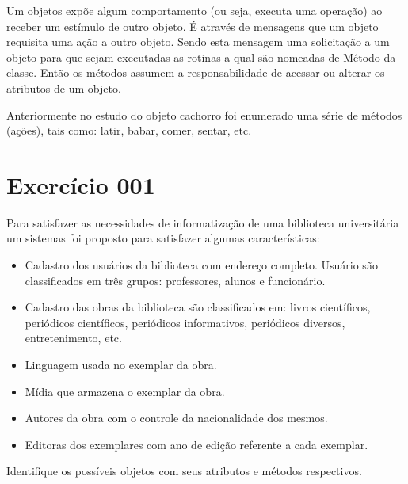 Um objetos expõe algum comportamento (ou seja, executa uma operação) ao 
receber um estímulo de outro objeto. É através de mensagens que um objeto 
requisita uma ação a outro objeto. Sendo esta mensagem uma solicitação a um 
objeto para que sejam executadas as rotinas a qual são nomeadas de Método da 
classe. Então os métodos assumem a responsabilidade de acessar ou alterar os 
atributos de um objeto.

Anteriormente no estudo do objeto cachorro foi enumerado uma série de métodos 
(ações), tais como: latir, babar, comer, sentar, etc.

\section{Exercício 001}

Para satisfazer as necessidades de informatização de uma biblioteca 
universitária um sistemas foi proposto para satisfazer algumas características:

\begin{itemize}
  \item Cadastro dos usuários da biblioteca com endereço completo. 
  Usuário são classificados em três grupos: professores, alunos e funcionário.  
  \item Cadastro das obras da biblioteca são classificados em: livros científicos, periódicos científicos, periódicos informativos, periódicos diversos, entretenimento, etc.
  \item Linguagem usada no exemplar da obra.
  \item Mídia que armazena o exemplar da obra.
  \item Autores da obra com o controle da nacionalidade dos mesmos.
  \item Editoras dos exemplares com ano de edição referente a cada exemplar.
\end{itemize}

Identifique os possíveis objetos com seus atributos e métodos respectivos.
